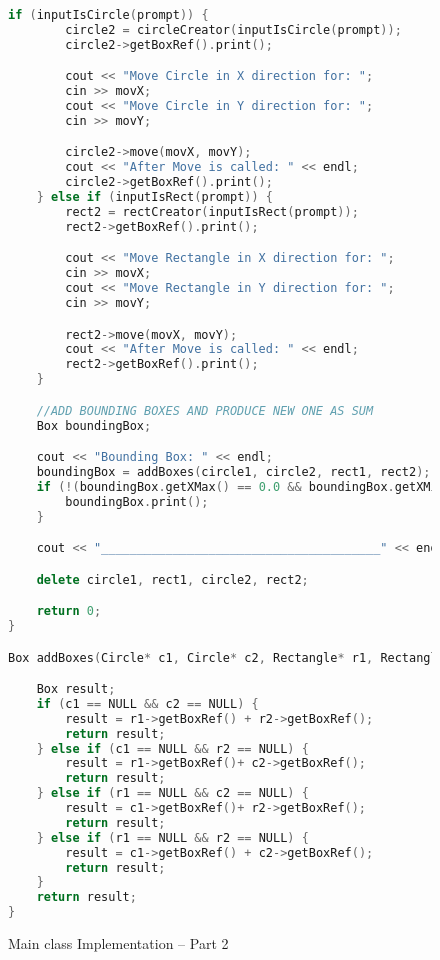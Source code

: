 \documentclass[a4paper, 10pt]{article}
\begin{document}
\begin{figure}[H]
\begin{lstlisting}[language=c++]
	if (inputIsCircle(prompt)) {
		circle2 = circleCreator(inputIsCircle(prompt));
		circle2->getBoxRef().print();

		cout << "Move Circle in X direction for: ";
		cin >> movX;
		cout << "Move Circle in Y direction for: ";
		cin >> movY;

		circle2->move(movX, movY);
		cout << "After Move is called: " << endl;
		circle2->getBoxRef().print();
	} else if (inputIsRect(prompt)) {
		rect2 = rectCreator(inputIsRect(prompt));
		rect2->getBoxRef().print();

		cout << "Move Rectangle in X direction for: ";
		cin >> movX;
		cout << "Move Rectangle in Y direction for: ";
		cin >> movY;

		rect2->move(movX, movY);
		cout << "After Move is called: " << endl;
		rect2->getBoxRef().print();
	}

	//ADD BOUNDING BOXES AND PRODUCE NEW ONE AS SUM
	Box boundingBox;

	cout << "Bounding Box: " << endl;
	boundingBox = addBoxes(circle1, circle2, rect1, rect2);
	if (!(boundingBox.getXMax() == 0.0 && boundingBox.getXMin() == 0.0 && boundingBox.getYMin() == 0.0 && boundingBox.getYMax() == 0.0)) {
		boundingBox.print();
	}

	cout << "_______________________________________" << endl;

	delete circle1, rect1, circle2, rect2;

	return 0;
}

Box addBoxes(Circle* c1, Circle* c2, Rectangle* r1, Rectangle* r2) {

	Box result;
	if (c1 == NULL && c2 == NULL) {
		result = r1->getBoxRef() + r2->getBoxRef();
		return result;
	} else if (c1 == NULL && r2 == NULL) {
		result = r1->getBoxRef()+ c2->getBoxRef();
		return result;
	} else if (r1 == NULL && c2 == NULL) {
		result = c1->getBoxRef()+ r2->getBoxRef();
		return result;
	} else if (r1 == NULL && r2 == NULL) {
		result = c1->getBoxRef() + c2->getBoxRef();
		return result;
	}
	return result;
}
\end{lstlisting}
\caption{Main class Implementation – Part 2}
\end{figure}
\end{document}
